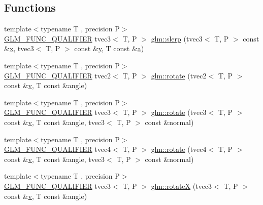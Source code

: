 \subsection*{Functions}
\begin{DoxyCompactItemize}
\item 
{\footnotesize template$<$typename T , precision P$>$ }\\\mbox{\hyperlink{setup_8hpp_a33fdea6f91c5f834105f7415e2a64407}{G\+L\+M\+\_\+\+F\+U\+N\+C\+\_\+\+Q\+U\+A\+L\+I\+F\+I\+ER}} tvec3$<$ T, P $>$ \mbox{\hyperlink{group__gtx__rotate__vector_gafc9ab3101c3f3799f3d5d6d9d3baac09}{glm\+::slerp}} (tvec3$<$ T, P $>$ const \&\mbox{\hyperlink{glad_8h_a92d0386e5c19fb81ea88c9f99644ab1d}{x}}, tvec3$<$ T, P $>$ const \&\mbox{\hyperlink{glad_8h_a66ddd433d2cacfe27f5906b7e86faeed}{y}}, T const \&\mbox{\hyperlink{glad_8h_ac8729153468b5dcf13f971b21d84d4e5}{a}})
\item 
{\footnotesize template$<$typename T , precision P$>$ }\\\mbox{\hyperlink{setup_8hpp_a33fdea6f91c5f834105f7415e2a64407}{G\+L\+M\+\_\+\+F\+U\+N\+C\+\_\+\+Q\+U\+A\+L\+I\+F\+I\+ER}} tvec2$<$ T, P $>$ \mbox{\hyperlink{group__gtx__rotate__vector_ga9bff444fb191e2e089a906b899cd033d}{glm\+::rotate}} (tvec2$<$ T, P $>$ const \&\mbox{\hyperlink{glad_8h_a14cfbe2fc2234f5504618905b69d1e06}{v}}, T const \&angle)
\item 
{\footnotesize template$<$typename T , precision P$>$ }\\\mbox{\hyperlink{setup_8hpp_a33fdea6f91c5f834105f7415e2a64407}{G\+L\+M\+\_\+\+F\+U\+N\+C\+\_\+\+Q\+U\+A\+L\+I\+F\+I\+ER}} tvec3$<$ T, P $>$ \mbox{\hyperlink{group__gtx__rotate__vector_ga526b6f8995bc0946aa1a04e9297de7c6}{glm\+::rotate}} (tvec3$<$ T, P $>$ const \&\mbox{\hyperlink{glad_8h_a14cfbe2fc2234f5504618905b69d1e06}{v}}, T const \&angle, tvec3$<$ T, P $>$ const \&normal)
\item 
{\footnotesize template$<$typename T , precision P$>$ }\\\mbox{\hyperlink{setup_8hpp_a33fdea6f91c5f834105f7415e2a64407}{G\+L\+M\+\_\+\+F\+U\+N\+C\+\_\+\+Q\+U\+A\+L\+I\+F\+I\+ER}} tvec4$<$ T, P $>$ \mbox{\hyperlink{group__gtx__rotate__vector_gaf4d59dd2f668f9ffb38048055d1316bd}{glm\+::rotate}} (tvec4$<$ T, P $>$ const \&\mbox{\hyperlink{glad_8h_a14cfbe2fc2234f5504618905b69d1e06}{v}}, T const \&angle, tvec3$<$ T, P $>$ const \&normal)
\item 
{\footnotesize template$<$typename T , precision P$>$ }\\\mbox{\hyperlink{setup_8hpp_a33fdea6f91c5f834105f7415e2a64407}{G\+L\+M\+\_\+\+F\+U\+N\+C\+\_\+\+Q\+U\+A\+L\+I\+F\+I\+ER}} tvec3$<$ T, P $>$ \mbox{\hyperlink{group__gtx__rotate__vector_ga0c2dc9f8507bffcbb957db9818b18508}{glm\+::rotateX}} (tvec3$<$ T, P $>$ const \&\mbox{\hyperlink{glad_8h_a14cfbe2fc2234f5504618905b69d1e06}{v}}, T const \&angle)

\end{DoxyCompactItemize}
